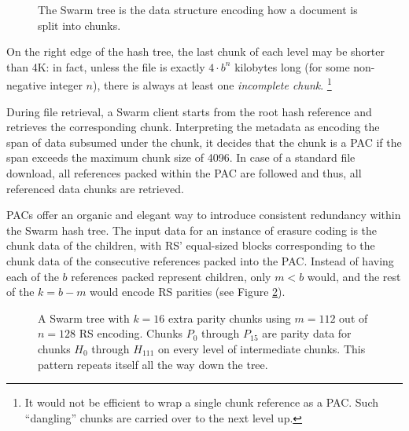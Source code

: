 \documentclass[manuscript,screen,review]{acmart}
\begin{document}
\begin{figure}[!ht]
   \centering
   
   \Description[]{}
   \caption[Swarm hash split]{The Swarm tree is the data structure encoding how a document is split into chunks.}
   \label{fig:Swarm-hash-split}
\end{figure}

On the right edge of the hash tree, the last chunk of each level may be shorter than 4K: in fact, unless the file is exactly $4\cdot b^n$ kilobytes long (for some non-negative integer $n$), there is always at least one \emph{incomplete chunk}.%
%
\footnote{It would not be efficient to wrap a single chunk reference as a PAC. Such ``dangling'' chunks are carried over to the next level up.}

During file retrieval, a Swarm client starts from the root hash reference and retrieves the corresponding chunk. Interpreting the metadata as encoding the span of data subsumed under the chunk, it decides that the chunk is a PAC if the span exceeds the maximum chunk size of 4096.
In case of a standard file download, all references packed within the PAC are followed and thus, all referenced data chunks are retrieved.

PACs offer an organic and elegant way to introduce consistent redundancy within the Swarm hash tree.
The input data for an instance of erasure coding is the chunk data of the children, with RS' equal-sized blocks corresponding to the chunk data of the consecutive references packed into the PAC. Instead of having each of the $b$ references packed represent children, only $m < b$ would, and the rest of the $k=b-m$ would encode RS parities (see Figure \ref{fig:Swarm-hash-erasure}).


\begin{figure}[!ht]
   \centering
   \resizebox{1\textwidth}{!}{
        
   }
   \Description[]{}
   \caption[Swarm hash erasure]{A Swarm tree with $k=16$ extra parity chunks using $m=112$ out of $n=128$ RS encoding. Chunks $P_{0}$ through $P_{15}$ are parity data for chunks $H_0 $ through $H_{111}$ on every level of intermediate chunks. This pattern repeats itself all the way down the tree. }
   \label{fig:Swarm-hash-erasure}
\end{figure}
\end{document}

